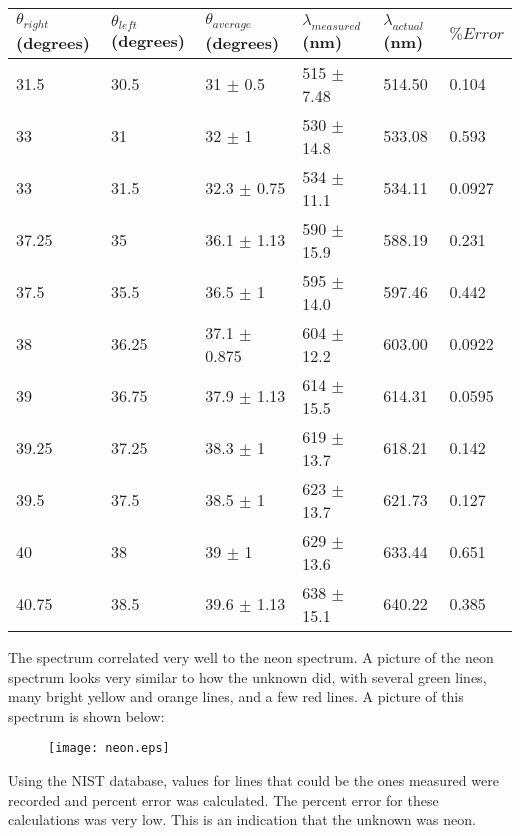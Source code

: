 \documentclass[singlecolumn, amsmath]{revtex4}
\begin{document}
	
\begin{center}
    \begin{tabular}{| l | l | l | l | l | l |}
    \hline
    $\theta_{right}$ (degrees) & $\theta_{left}$ (degrees) & $\theta_{average}$ (degrees) & $\lambda_{measured}$ (nm) & $\lambda_{actual}$ (nm) & $\% Error $ \\ \hline
    31.5  & 30.5  & 31 $\pm$ 0.5     & 515 $\pm$ 7.48 & 514.50 & 0.104   \\ \hline
    33    & 31    & 32 $\pm$ 1 	     & 530 $\pm$ 14.8 & 533.08 & 0.593   \\ \hline
    33    & 31.5  & 32.3 $\pm$ 0.75  & 534 $\pm$ 11.1 & 534.11 & 0.0927  \\ \hline
    37.25 & 35    & 36.1 $\pm$ 1.13  & 590 $\pm$ 15.9 & 588.19 & 0.231   \\ \hline
    37.5  & 35.5  & 36.5 $\pm$ 1     & 595 $\pm$ 14.0 & 597.46 & 0.442   \\ \hline
    38    & 36.25 & 37.1 $\pm$ 0.875 & 604 $\pm$ 12.2 & 603.00 & 0.0922  \\ \hline
    39    & 36.75 & 37.9 $\pm$ 1.13  & 614 $\pm$ 15.5 & 614.31 & 0.0595  \\ \hline
    39.25 & 37.25 & 38.3 $\pm$ 1     & 619 $\pm$ 13.7 & 618.21 & 0.142   \\ \hline
    39.5  & 37.5  & 38.5 $\pm$ 1     & 623 $\pm$ 13.7 & 621.73 & 0.127   \\ \hline
    40 	  & 38    & 39 $\pm$ 1 	     & 629 $\pm$ 13.6 & 633.44 & 0.651   \\ \hline
    40.75 & 38.5  & 39.6 $\pm$ 1.13  & 638 $\pm$ 15.1 & 640.22 & 0.385   \\
    \hline
    \end{tabular}
\end{center}

	The spectrum correlated very well to the neon spectrum. A picture of the neon spectrum looks very similar to how the unknown did, with several green lines, many bright yellow and orange lines, and a few red lines. A picture of this spectrum is shown below:

\begin{figure}[h]  

\texttt{[image: neon.eps]}  
\graphicspath{ {/home/evin/Desktop/School/Circuits/lab1} }

\end{figure}

	Using the NIST database, values for lines that could be the ones measured were recorded and percent error was calculated. The percent error for these calculations was very low. This is an indication that the unknown was neon.
\end{document}
